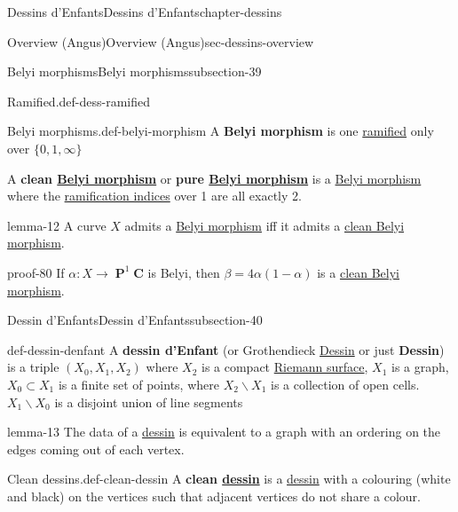\documentclass[oneside,10pt,]{book}
\newcommand{\terminology}[1]{\textbf{#1}}
\numberwithin{equation}{section}
\newcommand{\CC}{\mathbf{C}}
\DeclareMathOperator{\PP}{\mathbf{P}}
\begin{document}
\begin{chapterptx}{Dessins d'Enfants}{}{Dessins d'Enfants}{}{}{chapter-dessins}
\begin{sectionptx}{Overview (Angus)}{}{Overview (Angus)}{}{}{sec-dessins-overview}
\begin{subsectionptx}{Belyi morphisms}{}{Belyi morphisms}{}{}{subsection-39}
\begin{definition}{Ramified.}{def-dess-ramified}
\end{definition}
\begin{definition}{Belyi morphisms.}{def-belyi-morphism}%
\hypertarget{p-461}{}%
A \terminology{Belyi morphism} is one \hyperref[def-dess-ramified]{ramified} only over \(\{0,1,\infty\}\)%
\par
\hypertarget{p-462}{}%
A \terminology{clean \hyperref[def-belyi-morphism]{Belyi morphism}} or \terminology{pure \hyperref[def-belyi-morphism]{Belyi morphism}} is a \hyperref[def-belyi-morphism]{Belyi morphism} where the \hyperref[def-dess-ramified]{ramification indices} over 1 are all exactly 2.%
\end{definition}
\begin{lemma}{}{}{lemma-12}%
\hypertarget{p-463}{}%
A curve \(X\) admits a \hyperref[def-belyi-morphism]{Belyi morphism} iff it admits a \hyperref[def-belyi-morphism]{clean Belyi morphism}.%
\end{lemma}
\begin{proofptx}{}{proof-80}
\hypertarget{p-464}{}%
If \(\alpha \colon X\to \PP^1 \CC\) is Belyi, then \(\beta = 4\alpha(1-\alpha)\) is a \hyperref[def-belyi-morphism]{clean Belyi morphism}.%
\end{proofptx}
\end{subsectionptx}
%
%
\typeout{************************************************}
\typeout{************************************************}
%
\begin{subsectionptx}{Dessin d'Enfants}{}{Dessin d'Enfants}{}{}{subsection-40}
\begin{definition}{}{def-dessin-denfant}%
\hypertarget{p-465}{}%
A \terminology{dessin d'Enfant} (or Grothendieck \hyperref[def-dessin-denfant]{Dessin} or just \terminology{Dessin}) is a triple \((X_0,X_1,X_2)\) where \(X_2\) is a compact \hyperref[def-top-riem-surface]{Riemann surface}, \(X_1\) is a graph, \(X_0 \subset X_1\) is a finite set of points, where \(X_2 \smallsetminus X_1\) is a collection of open cells. \(X_1 \smallsetminus X_0\) is a disjoint union of line segments%
\end{definition}
\begin{lemma}{}{}{lemma-13}%
\hypertarget{p-466}{}%
The data of a \hyperref[def-dessin-denfant]{dessin} is equivalent to a graph with an ordering on the edges coming out of each vertex.%
\end{lemma}
\begin{definition}{Clean dessins.}{def-clean-dessin}%
\hypertarget{p-467}{}%
A \terminology{clean \hyperref[def-dessin-denfant]{dessin}} is a \hyperref[def-dessin-denfant]{dessin} with a colouring (white and black) on the vertices such that adjacent vertices do not share a colour.%

\end{definition}
\end{subsectionptx}
\end{sectionptx}
\end{chapterptx}
\end{document}
